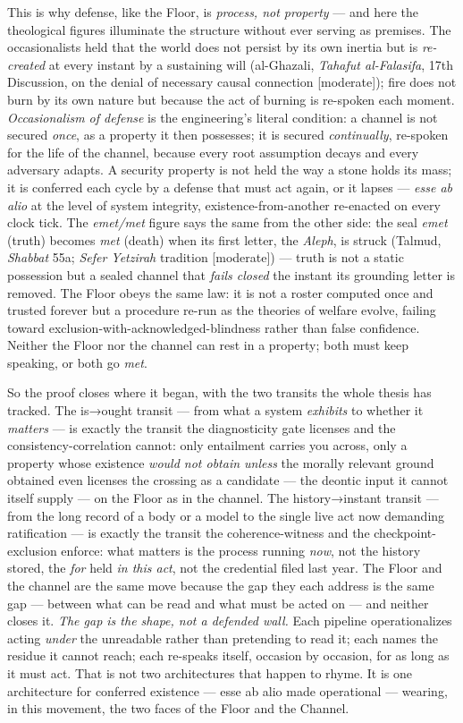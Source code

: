 \documentclass[11pt]{article}
\begin{document}
This is why defense, like the Floor, is \emph{process, not property} — and here the theological figures illuminate the structure without ever serving as premises. The occasionalists held that the world does not persist by its own inertia but is \emph{re-created} at every instant by a sustaining will (al-Ghazali, \emph{Tahafut al-Falasifa}, 17th Discussion, on the denial of necessary causal connection [moderate]); fire does not burn by its own nature but because the act of burning is re-spoken each moment. \emph{Occasionalism of defense} is the engineering's literal condition: a channel is not secured \emph{once}, as a property it then possesses; it is secured \emph{continually}, re-spoken for the life of the channel, because every root assumption decays and every adversary adapts. A security property is not held the way a stone holds its mass; it is conferred each cycle by a defense that must act again, or it lapses — \emph{esse ab alio} at the level of system integrity, existence-from-another re-enacted on every clock tick. The \emph{emet/\allowbreak{}met} figure says the same from the other side: the seal \emph{emet} (truth) becomes \emph{met} (death) when its first letter, the \emph{Aleph}, is struck (Talmud, \emph{Shabbat} 55a; \emph{Sefer Yetzirah} tradition [moderate]) — truth is not a static possession but a sealed channel that \emph{fails closed} the instant its grounding letter is removed. The Floor obeys the same law: it is not a roster computed once and trusted forever but a procedure re-run as the theories of welfare evolve, failing toward exclusion-with-acknowledged-blindness rather than false confidence. Neither the Floor nor the channel can rest in a property; both must keep speaking, or both go \emph{met}.

So the proof closes where it began, with the two transits the whole thesis has tracked. The is→ought transit — from what a system \emph{exhibits} to whether it \emph{matters} — is exactly the transit the diagnosticity gate licenses and the consistency-correlation cannot: only entailment carries you across, only a property whose existence \emph{would not obtain unless} the morally relevant ground obtained even licenses the crossing as a candidate — the deontic input it cannot itself supply — on the Floor as in the channel. The history→instant transit — from the long record of a body or a model to the single live act now demanding ratification — is exactly the transit the coherence-witness and the checkpoint-exclusion enforce: what matters is the process running \emph{now}, not the history stored, the \emph{for} held \emph{in this act}, not the credential filed last year. The Floor and the channel are the same move because the gap they each address is the same gap — between what can be read and what must be acted on — and neither closes it. \emph{The gap is the shape, not a defended wall.} Each pipeline operationalizes acting \emph{under} the unreadable rather than pretending to read it; each names the residue it cannot reach; each re-speaks itself, occasion by occasion, for as long as it must act. That is not two architectures that happen to rhyme. It is one architecture for conferred existence — esse ab alio made operational — wearing, in this movement, the two faces of the Floor and the Channel.
\end{document}
